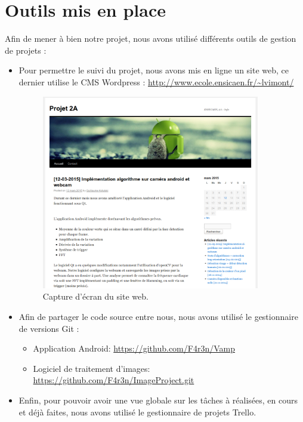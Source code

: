 \section{Outils mis en place}

Afin de mener à bien notre projet, nous avons utilisé différents outils de gestion de projets :

\begin{itemize}
	\item Pour permettre le suivi du projet, nous avons mis en ligne un site web, ce dernier utilise le CMS Wordpress : \url{http://www.ecole.ensicaen.fr/~lvimont/}

		\begin{figure}[h!]
			\centering
			\includegraphics[width=0.9\textwidth]{data/website.png}
			\caption{Capture d'écran du site web.}
		\end{figure}

	\item Afin de partager le code source entre nous, nous avons utilisé le gestionnaire de versions Git :
		\begin{itemize}[label=\textbullet]
			\item Application Android: \url{https://github.com/F4r3n/Vamp}
			\item Logiciel de traitement d'images: \url{https://github.com/F4r3n/ImageProject.git}
		\end{itemize}
	\item Enfin, pour pouvoir avoir une vue globale sur les tâches à réalisées, en cours et déjà faites, nous avons utilisé le gestionnaire de projets Trello.
\end{itemize}

